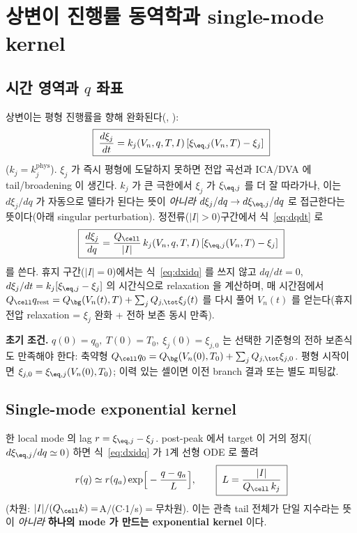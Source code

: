 \section{상변이 진행률 동역학과 single-mode kernel}\label{sec:dyn}
\subsection{시간 영역과 $q$ 좌표}
상변이는 평형 진행률을 향해 완화된다(, \cite{onsager1931,degrootmazur1962}):
\begin{equation}
\boxed{\;\frac{d\xi_j}{dt}=k_j(V_n,q,T,I)\,[\xi_{\eq,j}(V_n,T)-\xi_j]\;}
\label{eq:dxidt}
\end{equation}
($k_j=k_j^\mathrm{phys}$). $\xi_j$ 가 즉시 평형에 도달하지 못하면 전압 곡선과 ICA/DVA 에 tail/broadening 이
생긴다. $k_j$ 가 큰 극한에서 $\xi_j$ 가 $\xi_{\eq,j}$ 를 더 잘 따라가나, 이는 $d\xi_j/dq$ 가 자동으로
델타가 된다는 뜻이 \emph{아니라} $d\xi_j/dq\to d\xi_{\eq,j}/dq$ 로 접근한다는 뜻이다(아래 singular
perturbation). 정전류($|I|>0$)구간에서 식~\eqref{eq:dqdt} 로
\begin{equation}
\boxed{\;\frac{d\xi_j}{dq}=\frac{Q_\cell}{|I|}\,k_j(V_n,q,T,I)\,[\xi_{\eq,j}(V_n,T)-\xi_j]\;}
\label{eq:dxidq}
\end{equation}
를 쓴다. 휴지 구간($|I|=0$)에서는 식~\eqref{eq:dxidq} 를 쓰지 않고 $dq/dt=0$, $d\xi_j/dt=k_j[\xi_{\eq,j}-\xi_j]$
의 시간식으로 relaxation 을 계산하며, 매 시간점에서 $Q_\cell q_\mathrm{rest}=Q_\bg(V_n(t),T)+\sum_j
Q_{j,\tot}\xi_j(t)$ 를 다시 풀어 $V_n(t)$ 를 얻는다(휴지 전압 relaxation = $\xi_j$ 완화 + 전하 보존 동시 만족).

\textbf{초기 조건.} $q(0)=q_0,\ T(0)=T_0,\ \xi_j(0)=\xi_{j,0}$ 는 선택한 기준형의 전하 보존식도 만족해야
한다: 축약형 $Q_\cell q_0=Q_\bg(V_n(0),T_0)+\sum_j Q_{j,\tot}\xi_{j,0}$. 평형 시작이면
$\xi_{j,0}=\xi_{\eq,j}(V_n(0),T_0)$; 이력 있는 셀이면 이전 branch 결과 또는 별도 피팅값.

\subsection{Single-mode exponential kernel}\label{sec:singlemode}
한 local mode 의 lag $r=\xi_{\eq,j}-\xi_j$. post-peak 에서 target 이 거의 정지($d\xi_{\eq,j}/dq\simeq0$)
하면 식~\eqref{eq:dxidq} 가 1계 선형 ODE 로 풀려
\begin{equation}
r(q)\simeq r(q_a)\exp\!\Big[-\frac{q-q_a}{L}\Big],\qquad \boxed{\;L=\frac{|I|}{Q_\cell\,k_j}\;}
\label{eq:single_kernel}
\end{equation}
(차원: $|I|/(Q_\cell k)=$A$/$(C$\cdot$1/s)$=$무차원). 이는 관측 tail 전체가 단일 지수라는 뜻이 \emph{아니라}
\textbf{하나의 mode 가 만드는 exponential kernel} 이다.

